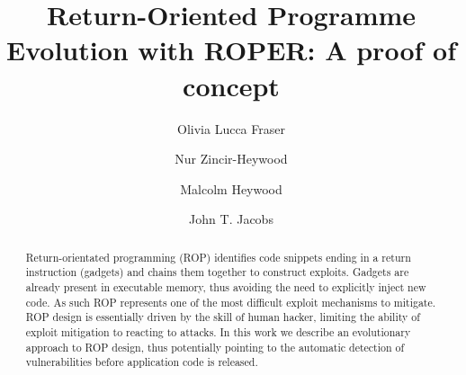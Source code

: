 \documentclass[sigconf]{acmart}
\begin{document}
\title{Return-Oriented Programme Evolution with ROPER: A proof of concept}


\author{Olivia Lucca Fraser}

\author{Nur Zincir-Heywood}

\author{Malcolm Heywood}

\author{John T. Jacobs}


\renewcommand{\shortauthors}{O. Fraser et al.}
\renewcommand{\shorttitle}{Return-Oriented Programme Evolution with ROPER}


\begin{abstract}
Return-orientated programming (ROP) identifies code snippets ending in a return instruction (gadgets) and chains them together to construct exploits. Gadgets are already present in executable memory, thus avoiding the need to explicitly inject new code. As such ROP represents one of the most difficult exploit mechanisms to mitigate. ROP design is essentially driven by the skill of human hacker, limiting the ability of exploit mitigation to reacting to attacks. In this work we describe an evolutionary approach to ROP design, thus potentially pointing to the automatic detection of vulnerabilities before application code is released.
\end{abstract}

\end{document}
